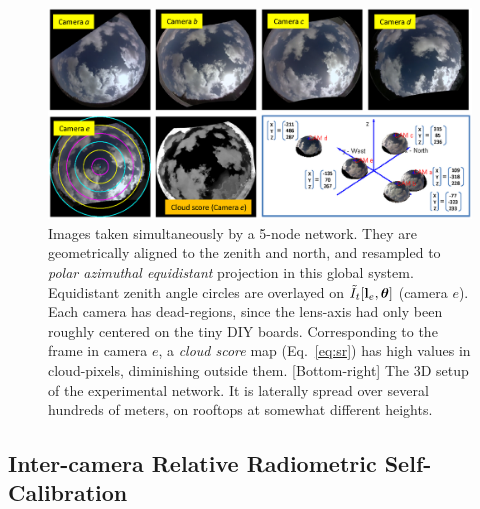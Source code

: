 \documentclass[runningheads]{llncs}
\begin{document}
\begin{figure}[t!]
\begin{center}
   \includegraphics[width=1\linewidth]{figures/scene_d.eps}
\end{center}
   \vspace{-1.2cm}
   \caption{Images taken simultaneously by a 5-node network. They are geometrically aligned to the zenith and north, and resampled to {\em polar azimuthal equidistant} projection in this global system. Equidistant zenith angle circles are overlayed on $\tilde I_t[{\bf l}_e,{\bm \theta}]$ (camera $e$). Each camera has dead-regions, since the lens-axis had only been roughly centered on the tiny DIY boards.
   Corresponding to the frame in camera $e$, a {\em cloud score} map (Eq.~\ref{eq:sr}) has high values in cloud-pixels, diminishing outside them. [Bottom-right] The 3D setup of the experimental network. It is laterally spread over several hundreds of meters, on rooftops at somewhat different heights.}
\label{fig:photomotion}
\end{figure}



\subsection{Inter-camera Relative Radiometric Self-Calibration}
\label{sec:mutiradio}

%
%
\end{document}
